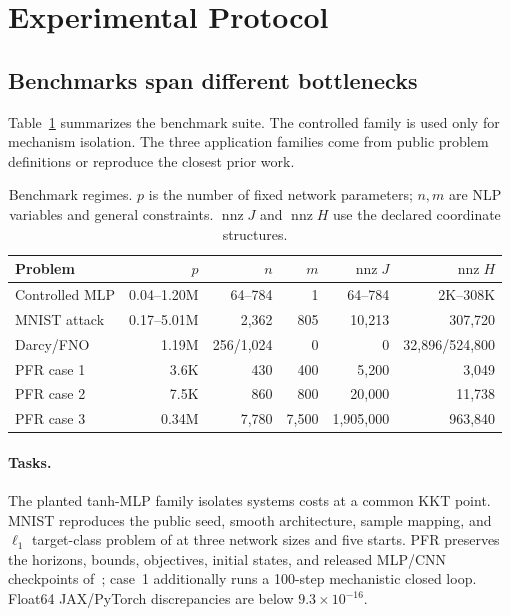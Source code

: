 \section{Experimental Protocol}
\label{sec:protocol}

\subsection{Benchmarks span different bottlenecks}

Table~\ref{tab:benchmarks} summarizes the benchmark suite.  The controlled
family is used only for mechanism isolation.  The three application families
come from public problem definitions or reproduce the closest prior work.

\begin{table}[t]
\centering
\caption{Benchmark regimes.  $p$ is the number of fixed network
parameters; $n,m$ are NLP variables and general constraints.  $\operatorname{nnz}J$
and $\operatorname{nnz}H$ use the declared coordinate structures.}
\label{tab:benchmarks}
\small
\setlength{\tabcolsep}{3.1pt}
\begin{tabular}{lrrrrr}
\toprule
Problem & $p$ & $n$ & $m$ & $\operatorname{nnz}J$ & $\operatorname{nnz}H$\\
\midrule
Controlled MLP & 0.04--1.20M & 64--784 & 1 & 64--784 & 2K--308K\\
MNIST attack & 0.17--5.01M & 2,362 & 805 & 10,213 & 307,720\\
Darcy/FNO & 1.19M & 256/1,024 & 0 & 0 & 32,896/524,800\\
PFR case 1 & 3.6K & 430 & 400 & 5,200 & 3,049\\
PFR case 2 & 7.5K & 860 & 800 & 20,000 & 11,738\\
PFR case 3 & 0.34M & 7,780 & 7,500 & 1,905,000 & 963,840\\
\bottomrule
\end{tabular}
\end{table}

\paragraph{Tasks.}
The planted tanh-MLP family isolates systems costs at a common KKT point.
MNIST reproduces the public seed, smooth architecture, sample mapping, and
$\ell_1$ target-class problem of \citet{parker2025gpu,lecun1998mnist} at three
network sizes and five starts.  PFR preserves the horizons, bounds, objectives,
initial states, and released MLP/CNN checkpoints
of~\mbox{\citet{elorza2025nmpc}}; case~1 additionally runs a 100-step
mechanistic closed loop.  Float64 JAX/PyTorch discrepancies are below $9.3\times10^{-16}$.

